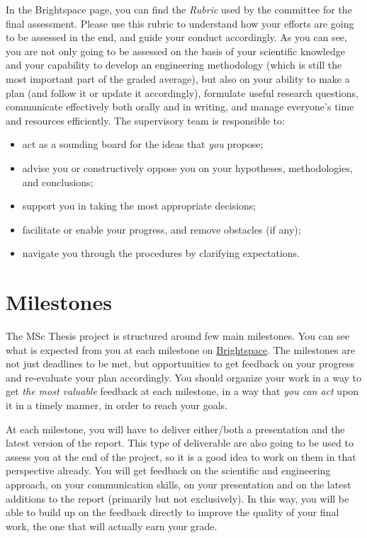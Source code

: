 In the Brightspace page, you can find the \emph{Rubric} used by the committee for the final assessment.
Please use this rubric to understand how your efforts are going to be assessed in the end, and guide your conduct accordingly.
%
As you can see, you are not only going to be assessed on the basis of your scientific knowledge and your capability to develop an engineering methodology (which is still the most important part of the graded average), but also on your ability to make a plan (and follow it or update it accordingly), formulate useful research questions, communicate effectively both orally and in writing, and manage everyone's time and resources efficiently.
%
The supervisory team is responsible to:
\begin{itemize}
    \item act as a sounding board for the ideas that \emph{you} propose;
    \item advise you or constructively oppose you on your hypotheses, methodologies, and conclusions;
    \item support you in taking the most appropriate decisions;
    \item facilitate or enable your progress, and remove obstacles (if any);
    \item navigate you through the procedures by clarifying expectations.
\end{itemize}


\section{Milestones}

The MSc Thesis project is structured around few main milestones.
You can see what is expected from you at each milestone on \href{https://brightspace.tudelft.nl/d2l/home/623070}{Brightspace}.
The milestones are not just deadlines to be met, but opportunities to get feedback on your progress and re-evaluate your plan accordingly.
You should organize your work in a way to get \emph{the most valuable} feedback at each milestone, in a way that \emph{you can act} upon it in a timely manner, in order to reach your goals.


At each milestone, you will have to deliver either/both a presentation and the latest version of the report.
This type of deliverable are also going to be used to assess you at the end of the project, so it is a good idea to work on them in that perspective already.
You will get feedback on the scientific and engineering approach, on your communication skills, on your presentation and on the latest additions to the report (primarily but not exclusively).
In this way, you will be able to build up on the feedback directly to improve the quality of your final work, the one that will actually earn your grade.


